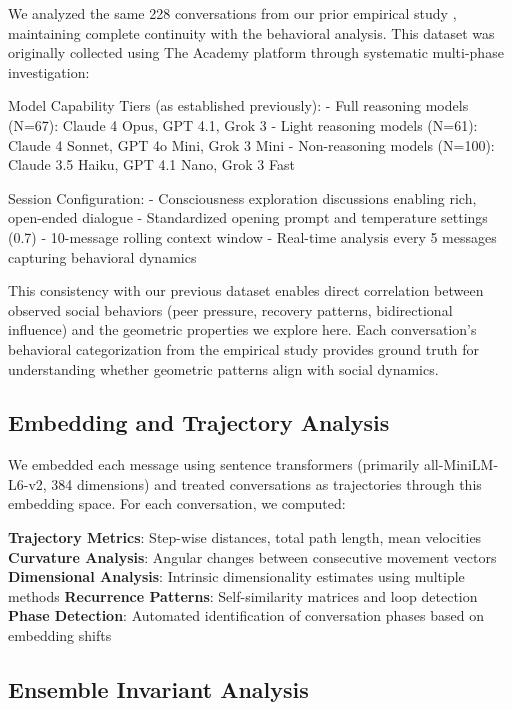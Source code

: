 \documentclass[11pt,letterpaper]{article}
\newcommand{\totalConversations}{228}
\newcommand{\fullReasoningN}{67}
\newcommand{\lightReasoningN}{61}
\newcommand{\nonReasoningN}{100}
\newcommand{\miniLMDim}{384}
\begin{document}
We analyzed the same \totalConversations{} conversations from our prior empirical study \citep{garcia2025peer}, maintaining complete continuity with the behavioral analysis. This dataset was originally collected using The Academy platform through systematic multi-phase investigation:

Model Capability Tiers (as established previously):
- Full reasoning models (N=\fullReasoningN{}): Claude 4 Opus, GPT 4.1, Grok 3
- Light reasoning models (N=\lightReasoningN{}): Claude 4 Sonnet, GPT 4o Mini, Grok 3 Mini  
- Non-reasoning models (N=\nonReasoningN{}): Claude 3.5 Haiku, GPT 4.1 Nano, Grok 3 Fast

Session Configuration:
- Consciousness exploration discussions enabling rich, open-ended dialogue
- Standardized opening prompt and temperature settings (0.7)
- 10-message rolling context window
- Real-time analysis every 5 messages capturing behavioral dynamics

This consistency with our previous dataset enables direct correlation between observed social behaviors (peer pressure, recovery patterns, bidirectional influence) and the geometric properties we explore here. Each conversation's behavioral categorization from the empirical study provides ground truth for understanding whether geometric patterns align with social dynamics.

\subsection{Embedding and Trajectory Analysis}

We embedded each message using sentence transformers (primarily all-MiniLM-L6-v2, \miniLMDim{} dimensions) and treated conversations as trajectories through this embedding space. For each conversation, we computed:

\textbf{Trajectory Metrics}: Step-wise distances, total path length, mean velocities
\textbf{Curvature Analysis}: Angular changes between consecutive movement vectors
\textbf{Dimensional Analysis}: Intrinsic dimensionality estimates using multiple methods
\textbf{Recurrence Patterns}: Self-similarity matrices and loop detection
\textbf{Phase Detection}: Automated identification of conversation phases based on embedding shifts

\subsection{Ensemble Invariant Analysis}
\end{document}
